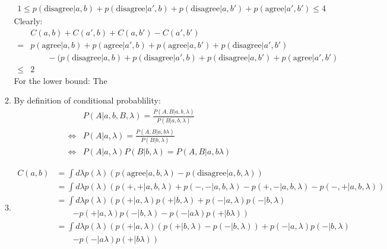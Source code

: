 \documentclass[12pt,a4]{article}
\begin{document}
\begin{enumerate}
\begin{enumerate}
        \begin{align*}
          1 \le p(\text{disagree}|a, b) + p(\text{disagree}|a', b) + p(\text{disagree}|a, b') + p(\text{agree}|a', b') \le 4
        \end{align*}
        Clearly:
        \begin{align*}
          & C(a, b) + C(a', b) + C(a, b') - C(a', b')\\
        = & p(\text{agree}|a, b) + p(\text{agree}|a', b) + p(\text{agree}|a, b')  + p(\text{disagree}|a', b')\\
          & \qquad  - (p(\text{disagree}|a, b) + p(\text{disagree}|a', b)+ p(\text{disagree}|a, b') + p(\text{agree}|a', b')\\
      \le & 2
        \end{align*}
        For the lower bound:
        The 
      \item
        By definition of conditional probablility:
        \begin{align*}
                           & P(A | a, b, B, \lambda) =\frac{ P(A, B | a, b , \lambda)}{P(B | a, b, \lambda)} \\
           \Leftrightarrow & P(A | a, \lambda) = \frac{ P(A, B | a, b \lambda)}{P(B |b, \lambda)} \\
           \Leftrightarrow & P(A | a, \lambda) P(B |b, \lambda) = P(A, B | a, b \lambda)
        \end{align*}
      \item
        \begin{align*}
          C(a,b) &= \int d\lambda p(\lambda) (p(\text{agree} | a, b, \lambda) - p(\text{disagree} | a, b, \lambda))\\
                 &= \int d\lambda p(\lambda) (p(+, + | a, b, \lambda) + p(-, - | a, b, \lambda) - p(+, -| a, b, \lambda) - p(-, +| a, b, \lambda))\\
                 &= \int d\lambda p(\lambda) \left(p(+| a, \lambda)p(+|b, \lambda) + p(-| a,\lambda)p(-| b,\lambda) \right.\\
                 & \qquad \left. - p(+| a, \lambda)p(- | b, \lambda) - p(- | a \lambda)p(+ | b \lambda)\right)\\
                 &= \int d\lambda p(\lambda) \left(p(+| a, \lambda)(p(+|b, \lambda) - p(- | b, \lambda)) + p(-| a,\lambda)p(-| b,\lambda) \right.\\
                 & \qquad \left.  - p(- | a \lambda)p(+ | b \lambda)\right)\\

\end{align*}
\end{enumerate}
\end{enumerate}
\end{document}
